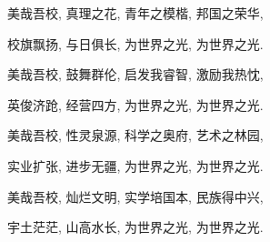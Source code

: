 美哉吾校, 真理之花, 青年之模楷, 邦国之荣华, 

校旗飘扬, 与日俱长, 为世界之光, 为世界之光. 

美哉吾校, 鼓舞群伦, 启发我睿智, 激励我热忱, 

英俊济跄, 经营四方, 为世界之光, 为世界之光. 

美哉吾校, 性灵泉源, 科学之奥府, 艺术之林园, 

实业扩张, 进步无疆, 为世界之光, 为世界之光. 

美哉吾校, 灿烂文明, 实学培国本, 民族得中兴, 

宇土茫茫, 山高水长, 为世界之光, 为世界之光. 
